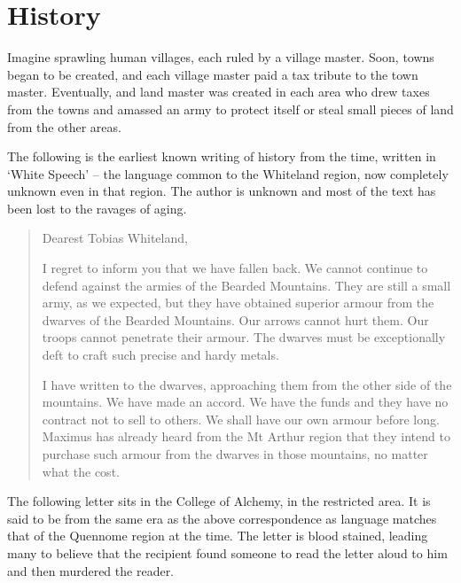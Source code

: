 \chapter{History}

\begin{multicols}{2}

Imagine sprawling human villages, each ruled by a village master.
Soon, towns began to be created, and each village master paid a tax tribute to the town master.
Eventually, and land master was created in each area who drew taxes from the towns and amassed an army to protect itself or steal small pieces of land from the other areas.

The following is the earliest known writing of history from the time, written in `White Speech' -- the language common to the Whiteland region, now completely unknown even in that region.
The author is unknown and most of the text has been lost to the ravages of aging.

\begin{quotation}

	Dearest Tobias Whiteland,

	I regret to inform you that we have fallen back.
	We cannot continue to defend against the armies of the Bearded Mountains.
	They are still a small army, as we expected, but they have obtained superior armour from the dwarves of the Bearded Mountains.
	Our arrows cannot hurt them.
	Our troops cannot penetrate their armour.
	The dwarves must be exceptionally deft to craft such precise and hardy metals.

	I have written to the dwarves, approaching them from the other side of the mountains.
	We have made an accord.
	We have the funds and they have no contract not to sell to others.
	We shall have our own armour before long.
	Maximus has already heard from the Mt Arthur region that they intend to purchase such armour from the dwarves in those mountains, no matter what the cost.

\end{quotation}

The following letter sits in the College of Alchemy, in the restricted area.
It is said to be from the same era as the above correspondence as language matches that of the Quennome region at the time.
The letter is blood stained, leading many to believe that the recipient found someone to read the letter aloud to him and then murdered the reader.

\begin{quotation}


\end{quotation}
\end{multicols}
